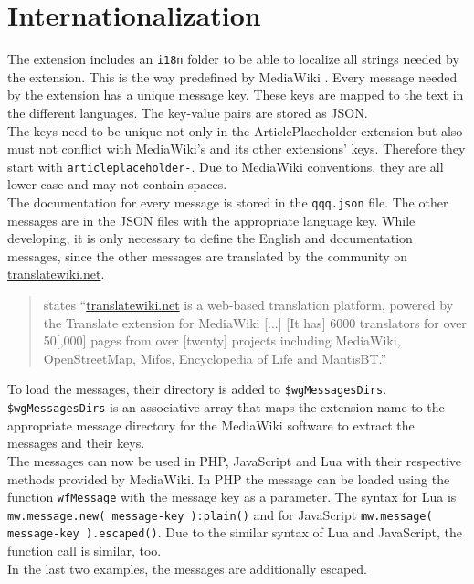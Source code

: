 \section{Internationalization}

The extension includes an \texttt{\justify i18n} folder to be able to localize all strings needed by the extension. This is the way predefined by MediaWiki \citep{wiki:34}.  Every message needed by the extension has a unique message key. These keys are mapped to the text in the different languages. The key-value pairs are stored as JSON. \\
The keys need to be unique not only in the ArticlePlaceholder extension but also must not conflict with MediaWiki's and its other extensions' keys. Therefore they start with \texttt{\justify articleplaceholder-}. Due to MediaWiki conventions, they are all lower case and may not contain spaces. \\
The documentation for every message is stored in the \texttt{\justify qqq.json} file. The other messages are in the JSON files with the appropriate language key. While developing, it is only necessary to define the English and documentation messages, since the other messages are translated by the community on \url{translatewiki.net}.
\begin{quote}
 \citet{wiki:26} states ``\url{translatewiki.net} is a web-based translation platform, powered by the Translate extension for MediaWiki [...] [It has] 6000 translators for over 50[,000] pages from over [twenty] projects including MediaWiki, OpenStreetMap, Mifos, Encyclopedia of Life and MantisBT.''
\end{quote}

To load the messages, their directory is added to \texttt{\justify \$wgMessagesDirs}. \texttt{\justify \$wgMessagesDirs} is an associative array that maps the extension name to the appropriate message directory for the MediaWiki software to extract the messages and their keys. \\
The messages can now be used in PHP, JavaScript and Lua with their respective methods provided by MediaWiki. In PHP the message can be loaded using the function \texttt{\justify wfMessage} with the message key as a parameter. The syntax for Lua is \texttt{\justify mw.message.new( message-key ):plain()} and for JavaScript \texttt{\justify mw.message( message-key ).escaped()}. Due to the similar syntax of Lua and JavaScript, the function call is similar, too. \\ 
In the last two examples, the messages are additionally escaped.